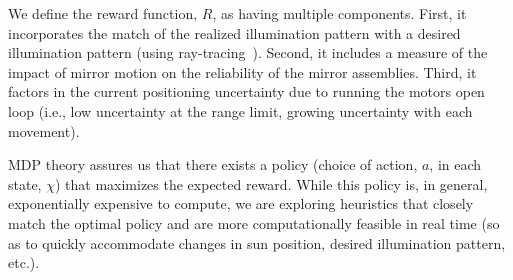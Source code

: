 We define the reward function, $R$, as having multiple components. First,
it incorporates the match of the realized illumination pattern with a
desired illumination pattern (using ray-tracing~\cite{acadia18}).
Second, it includes a measure of the impact
of mirror motion on the reliability of the mirror assemblies. Third, it
factors in the current positioning uncertainty due to running the
motors open loop (i.e., low uncertainty at the range limit, growing
uncertainty with each movement).

MDP theory assures us that there exists a policy (choice
of action, $a$, in each state, $\chi$) that maximizes the expected reward.
While this policy is, in general, exponentially expensive
to compute, we are exploring heuristics that closely match the optimal
policy and are more computationally feasible in real time (so as to quickly
accommodate changes in sun position, desired illumination pattern, etc.).
